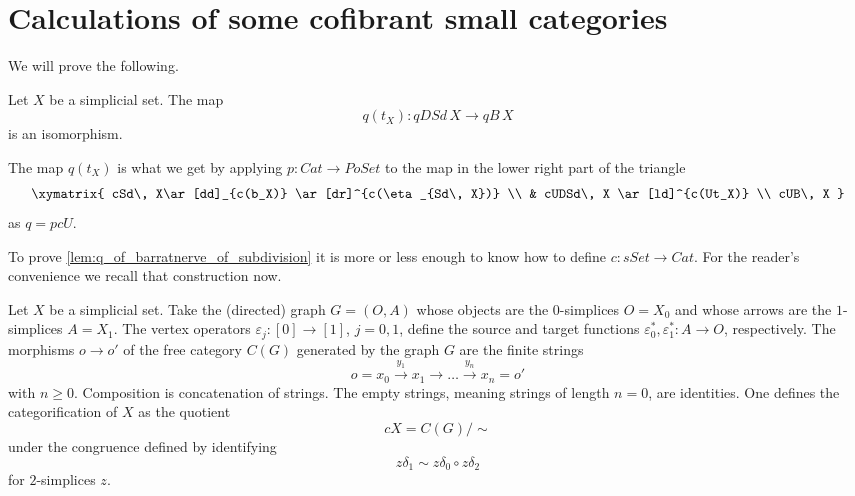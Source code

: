 

\section{Calculations of some cofibrant small categories}
\label{sec:calculations}



We will prove the following.
\begin{lemma}\label{lem:q_of_barratnerve_of_subdivision}
Let $X$ be a simplicial set. The map
\[q(t_X):qDSd\, X\to qB\, X\]
is an isomorphism.
\end{lemma}
\noindent The map $q(t_X)$ is what we get by applying $p:Cat\to PoSet$ to the map in the lower right part of the triangle
\begin{displaymath}
\xymatrix{
cSd\, X\ar[dd]_{c(b_X)} \ar[dr]^{c(\eta _{Sd\, X})} \\
& cUDSd\, X \ar[ld]^{c(Ut_X)} \\
cUB\, X
}
\end{displaymath}
as $q=pcU$.

To prove \cref{lem:q_of_barratnerve_of_subdivision} it is more or less enough to know how to define $c:sSet\to Cat$. For the reader's convenience we recall that construction now.

Let $X$ be a simplicial set. Take the (directed) graph $G=(O,A)$ whose objects are
the $0$-simplices $O=X_0$ and whose arrows are the $1$-simplices $A=X_1$. The vertex operators $\varepsilon _j:[0]\to [1]$, $j=0,1$, define the source and target functions $\varepsilon _0^*,\varepsilon _1^*:A\to O$, respectively. The morphisms $o\to o'$ of the free category $C(G)$ generated by the graph $G$ are the finite strings
\[o=x_0\xrightarrow{y_1} x_1\to \dots \xrightarrow{y_n} x_n=o'\]
with $n\geq 0$. Composition is concatenation of strings. The empty strings, meaning strings of length $n=0$, are identities. One defines the categorification of $X$ as the quotient
\[cX=C(G)/\sim\]
under the congruence defined by identifying
\[z\delta _1\sim z\delta _0\circ z\delta _2\]
for $2$-simplices $z$.

